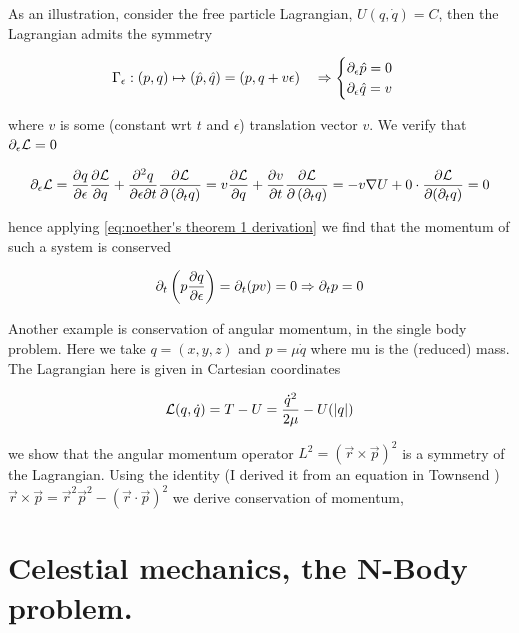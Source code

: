 \documentclass[12pt]{article}
\begin{document}
 As an illustration, consider the free particle Lagrangian, $U(q,\dot q) = C$, then the Lagrangian admits the symmetry

$$\Gamma_\epsilon : (p,q)\mapsto (\hat p,\hat q) = (p,q + v\epsilon) \quad \Rightarrow \begin{cases} \partial_\epsilon \hat p = 0\\ \partial_\epsilon \hat q = v \end{cases}$$

where $v$ is some (constant wrt $t$ and $\epsilon$) translation vector $v$. We verify that $\partial_\epsilon \mathcal L = 0$

$$\partial_\epsilon \mathcal L = \frac{\partial q}{\partial \epsilon}\frac{\partial \mathcal L}{\partial q} + \frac{\partial^2 q}{\partial \epsilon\partial t}\frac{\partial \mathcal L}{\partial \left( \partial_t q \right)} = v\frac{\partial \mathcal L}{\partial q} + \frac{\partial v}{\partial t}\frac{\partial \mathcal L}{\partial \left(\partial_t q\right)} = -v\nabla U + 0\cdot \frac{\partial \mathcal L}{\partial (\partial_t q)} = 0$$

hence applying \eqref{eq:noether's theorem 1 derivation} we find that the momentum of such a system is conserved

\begin{equation}\label{eq:momentum conserved}
    \partial_t \left(p\frac{\partial q}{\partial \epsilon}\right) = \partial_t (pv) = 0 \Rightarrow \partial_t p = 0
\end{equation}

 Another example is conservation of angular momentum, in the single body problem. Here we take $q = (x,y,z)$ and $p = \mu \dot q$ where mu is the (reduced) mass. The Lagrangian here is given in Cartesian coordinates 

\begin{equation}\label{eq:lagrangian one body problem}
    \mathcal L(q,\dot q) = T - U = \frac{\dot q^2}{2\mu} - U(|q|)
\end{equation}

we show that the angular momentum operator $L^2 = \left(\vec r\times \vec p\right)^2$ is a symmetry of the Lagrangian. Using the identity (I derived it from an equation in Townsend \cite{Townsend}) $\vec r\times\vec p = \vec r^2\vec p^2 - (\vec r\cdot \vec p)^2$ we derive conservation of momentum, 

\section{Celestial mechanics, the N-Body problem.}
\end{document}
